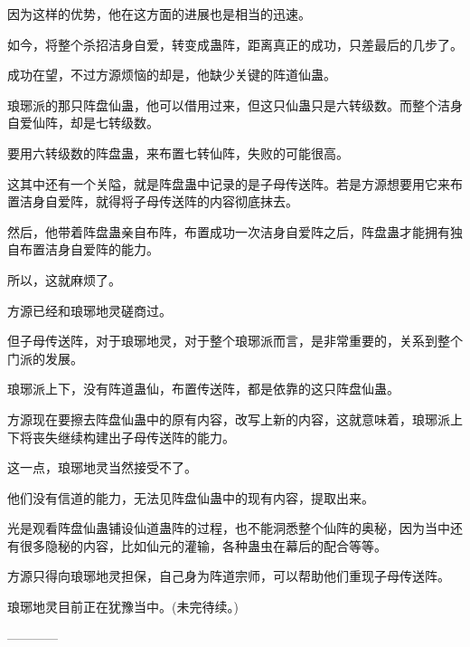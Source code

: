 \begin{this_body}
因为这样的优势，他在这方面的进展也是相当的迅速。

如今，将整个杀招洁身自爱，转变成蛊阵，距离真正的成功，只差最后的几步了。

成功在望，不过方源烦恼的却是，他缺少关键的阵道仙蛊。

琅琊派的那只阵盘仙蛊，他可以借用过来，但这只仙蛊只是六转级数。而整个洁身自爱仙阵，却是七转级数。

要用六转级数的阵盘蛊，来布置七转仙阵，失败的可能很高。

这其中还有一个关隘，就是阵盘蛊中记录的是子母传送阵。若是方源想要用它来布置洁身自爱阵，就得将子母传送阵的内容彻底抹去。

然后，他带着阵盘蛊亲自布阵，布置成功一次洁身自爱阵之后，阵盘蛊才能拥有独自布置洁身自爱阵的能力。

所以，这就麻烦了。

方源已经和琅琊地灵磋商过。

但子母传送阵，对于琅琊地灵，对于整个琅琊派而言，是非常重要的，关系到整个门派的发展。

琅琊派上下，没有阵道蛊仙，布置传送阵，都是依靠的这只阵盘仙蛊。

方源现在要擦去阵盘仙蛊中的原有内容，改写上新的内容，这就意味着，琅琊派上下将丧失继续构建出子母传送阵的能力。

这一点，琅琊地灵当然接受不了。

他们没有信道的能力，无法见阵盘仙蛊中的现有内容，提取出来。

光是观看阵盘仙蛊铺设仙道蛊阵的过程，也不能洞悉整个仙阵的奥秘，因为当中还有很多隐秘的内容，比如仙元的灌输，各种蛊虫在幕后的配合等等。

方源只得向琅琊地灵担保，自己身为阵道宗师，可以帮助他们重现子母传送阵。

琅琊地灵目前正在犹豫当中。(未完待续。)

------------

\end{this_body}

